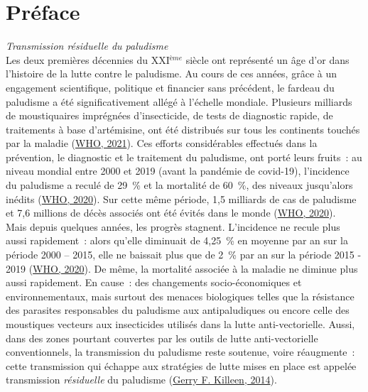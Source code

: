 \documentclass[12pt,twoside]{reedthesis}
\begin{document}
\mainmatter %
\pagestyle{fancyplain} %




















\hypertarget{pruxe9face}{%
\chapter*{Préface}\label{pruxe9face}}

\emph{Transmission résiduelle du paludisme}\\

Les deux premières décennies du XXI\(^{ème}\) siècle ont représenté un âge d'or dans l'histoire de la lutte contre le paludisme. Au cours de ces années, grâce à un engagement scientifique, politique et financier sans précédent, le fardeau du paludisme a été significativement allégé à l'échelle mondiale. Plusieurs milliards de moustiquaires imprégnées d'insecticide, de tests de diagnostic rapide, de traitements à base d'artémisine, ont été distribués sur tous les continents touchés par la maladie (\protect\hyperlink{ref-who_2021}{WHO, 2021}). Ces efforts considérables effectués dans la prévention, le diagnostic et le traitement du paludisme, ont porté leurs fruits~: au niveau mondial entre 2000 et 2019 (avant la pandémie de covid-19), l'incidence du paludisme a reculé de 29~\% et la mortalité de 60~\%, des niveaux jusqu'alors inédits (\protect\hyperlink{ref-who_2020_world_nodate}{WHO, 2020}). Sur cette même période, 1,5 milliards de cas de paludisme et 7,6 millions de décès associés ont été évités dans le monde (\protect\hyperlink{ref-who_2020_world_nodate}{WHO, 2020}).\\

Mais depuis quelques années, les progrès stagnent. L'incidence ne recule plus aussi rapidement~: alors qu'elle diminuait de 4,25~\% en moyenne par an sur la période 2000 -- 2015, elle ne baissait plus que de 2~\% par an sur la période 2015 - 2019 (\protect\hyperlink{ref-who_2020_world_nodate}{WHO, 2020}). De même, la mortalité associée à la maladie ne diminue plus aussi rapidement. En cause~: des changements socio-économiques et environnementaux, mais surtout des menaces biologiques telles que la résistance des parasites responsables du paludisme aux antipaludiques ou encore celle des moustiques vecteurs aux insecticides utilisés dans la lutte anti-vectorielle. Aussi, dans des zones pourtant couvertes par les outils de lutte anti-vectorielle conventionnels, la transmission du paludisme reste soutenue, voire réaugmente~: cette transmission qui échappe aux stratégies de lutte mises en place est appelée transmission \emph{résiduelle} du paludisme (\protect\hyperlink{ref-killeen_characterizing_2014}{Gerry F. Killeen, 2014}).\\
\end{document}
